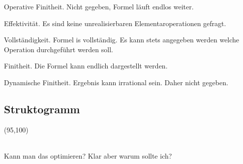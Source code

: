 \documentclass[11pt]{article} %
\begin{document}
Operative Finitheit.
Nicht gegeben, Formel läuft endlos weiter.

Effektivität.
Es sind keine unrealisierbaren Elementaroperationen gefragt.

Vollständigkeit.
Formel is vollständig. Es kann stets angegeben werden welche Operation durchgeführt werden soll.

Finitheit.
Die Formel kann endlich dargestellt werden.

Dynamische Finitheit.
Ergebnis kann irrational sein. Daher nicht gegeben.

\subsection{Struktogramm}

\sProofOn
\begin{struktogramm}(95,100)
		\whileend
	\whileend
\end{struktogramm}
\sProofOff
\\
Kann man das optimieren? Klar aber warum sollte ich? \\
\end{document}
